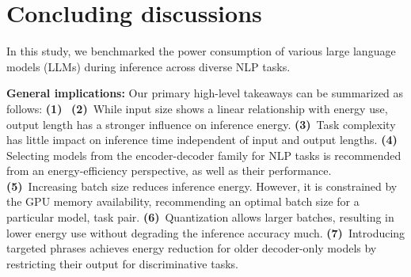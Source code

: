 
\section{Concluding discussions}
\label{sec:conc}

In this study, we benchmarked the power consumption of various large language models (LLMs) during inference across diverse NLP tasks. 


\vspace{2mm}
\noindent \textbf{General implications:} 
Our primary high-level takeaways can be summarized as follows: 
%
\textbf{(1)}~%
%
\textbf{(2)}~While input size shows a linear relationship with energy use, output length has a stronger influence on inference energy.
%
\textbf{(3)}~Task complexity has little impact on inference time independent of input and output lengths.
%
\textbf{(4)}~ %
Selecting models from the encoder-decoder family for NLP tasks is recommended from an energy-efficiency perspective, as well as their performance.
%
\textbf{(5)}~Increasing batch size reduces inference energy. However, it is constrained by the GPU memory availability, recommending an optimal batch size for a particular model, task pair. 
%
\textbf{(6)}~Quantization allows larger batches, resulting in lower energy use without degrading the inference accuracy much.
%
\textbf{(7)}~Introducing targeted phrases achieves energy reduction for older decoder-only models by restricting their output for discriminative tasks. 


